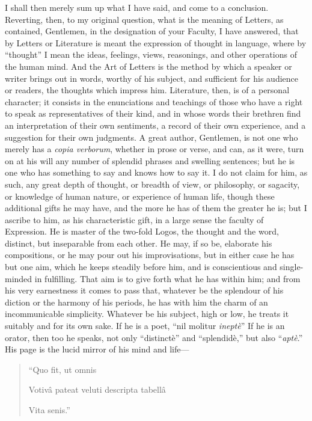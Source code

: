 I shall then merely sum up what I have said, and come to a
conclusion. Reverting, then, to my original question, what is the
meaning of Letters, as contained, Gentlemen, in the designation of
your Faculty, I have answered, that by Letters or Literature is meant
the expression of thought in language, where by ``thought'' I
mean the ideas, feelings, views, reasonings, and other operations of
the human mind. And the Art of Letters is the method by which a
speaker or writer brings out in words, worthy of his subject, and
sufficient for his audience or readers, the thoughts which impress
him. Literature, then, is of a personal character; it consists in the
enunciations and teachings of those who have a right to speak as
representatives of their kind, and in whose words their brethren find
an interpretation of their own sentiments, a record of their own
experience, and a suggestion for their own judgments. A great author,
Gentlemen, is not one who merely has a \emph{copia verborum}, whether
in prose or verse, and can, as it were, turn on at his will any number
of splendid phrases and swelling sentences; but he is one who has
something to say and knows how to say it. I do not claim for him, as
such, any great depth of thought, or breadth of view, or philosophy,
or sagacity, or knowledge of human nature, or experience of human
life, though these additional gifts he may have, and the more he has
of them the greater he is; but I ascribe to him, as his characteristic
gift, in a large sense the faculty of Expression. He is master of the
two-fold Logos, the thought and the word, distinct, but inseparable
from each other. He may, if so be, elaborate his compositions,
or he may pour out his improvisations, but in either case he has but
one aim, which he keeps steadily before him, and is conscientious and
single-minded in fulfilling. That aim is to give forth what he has
within him; and from his very earnestness it comes to pass that,
whatever be the splendour of his diction or the harmony of his
periods, he has with him the charm of an incommunicable simplicity.
Whatever be his subject, high or low, he treats it suitably and for
its own sake. If he is a poet, ``nil molitur \emph{ineptè}''
If he is an orator, then too he speaks, not only ``distinctè''
and ``splendidè,'' but also ``\emph{aptè}.'' His
page is the lucid mirror of his mind and life—

\begin{quote}

``Quo fit, ut omnis

Votivâ pateat veluti descripta tabellâ

Vita senis.''

\end{quote}


